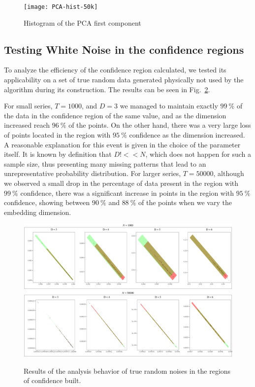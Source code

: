 \begin{figure}
    \centering
    \texttt{[image: PCA-hist-50k]}
    \caption{Histogram of the PCA first component }
    \label{fig:PCA-Hist}
\end{figure}

\subsection{Testing White Noise in the confidence regions}

To analyze the efficiency of the confidence region calculated, we tested its applicability on a set of true random data generated physically not used by the algorithm during its construction. 
The results can be seen in Fig.~\ref{fig:RNG}.

For small series, $T = 1000$, and $D = 3$ we managed to maintain exactly $\SI{99}{\percent}$ of the data in the confidence region of the same value, and as the dimension increased reach $\SI{96}{\percent}$ of the points.
On the other hand, there was a very large loss of points located in the region with $\SI{95}{\percent}$ confidence as the dimension increased.
A reasonable explanation for this event is given in the choice of the parameter itself.
It is known by definition that $D! << N$, which does not happen for such a sample size, thus presenting many missing patterns that lead to an unrepresentative probability distribution.
For larger series, $T = 50000$, although we observed a small drop in the percentage of data present in the region with $\SI{99}{\percent}$ confidence, there was a significant increase in points in the region with $\SI{95}{\percent}$ confidence, showing between $\SI{90}{\percent}$ and $\SI{88}{\percent}$ of the points when we vary the embedding dimension.

\begin{figure}
    \centering
    \includegraphics[width=\linewidth]{Figures/RNG-1000.pdf}
    \includegraphics[width=\linewidth]{Figures/RNG-50000.pdf}
    \caption{Results of the analysis behavior of true random noises in the regions of confidence built.}
    \label{fig:RNG}
\end{figure}

